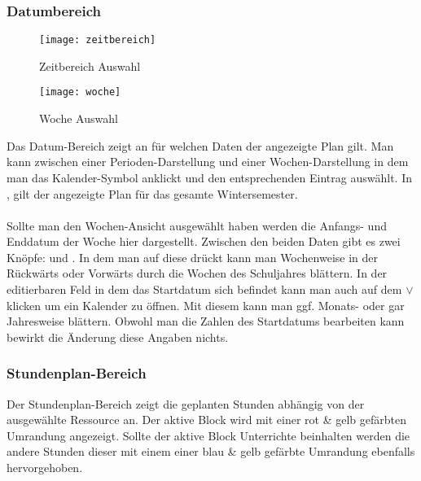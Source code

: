\subsubsection{Datumbereich}

\begin{wrapfigure}{r}{0.4\textwidth}
	\centering
	\vspace{-14pt}
	\texttt{[image: zeitbereich]}
	\vspace{-5pt}
	\caption{Zeitbereich Auswahl}
	\label{fig:zeitbereich}
	\vspace{14pt}
	\texttt{[image: woche]}
	\vspace{-5pt}
	\caption{Woche Auswahl}
	\label{fig:woche}
\end{wrapfigure}

Das Datum-Bereich zeigt an für welchen Daten der angezeigte Plan gilt. Man kann zwischen einer Perioden-Darstellung und einer Wochen-Darstellung in dem man das Kalender-Symbol anklickt und den entsprechenden Eintrag auswählt. In , gilt der angezeigte Plan für das gesamte Wintersemester.\\
\\
Sollte man den Wochen-Ansicht ausgewählt haben werden die Anfangs- und Enddatum der Woche hier dargestellt. Zwischen den beiden Daten gibt es zwei Knöpfe: \UParrow \hspace{2pt} und \DOWNarrow. In dem man auf diese drückt kann man Wochenweise in der Rückwärts \UParrow \hspace{2pt} oder Vorwärts \DOWNarrow \hspace{2pt} durch die Wochen des Schuljahres blättern. In der editierbaren Feld in dem das Startdatum sich befindet kann man auch auf dem $\vee$ klicken um ein Kalender zu öffnen. Mit diesem kann man ggf. Monats- oder gar Jahresweise blättern. Obwohl man die Zahlen des Startdatums bearbeiten kann bewirkt die Änderung diese Angaben nichts.

\subsubsection{Stundenplan-Bereich}

Der Stundenplan-Bereich zeigt die geplanten Stunden abhängig von der ausgewählte Ressource an. Der aktive Block wird mit einer rot \& gelb gefärbten Umrandung angezeigt. Sollte der aktive Block Unterrichte beinhalten werden die andere Stunden dieser mit einem einer blau \& gelb gefärbte Umrandung ebenfalls hervorgehoben.\\

